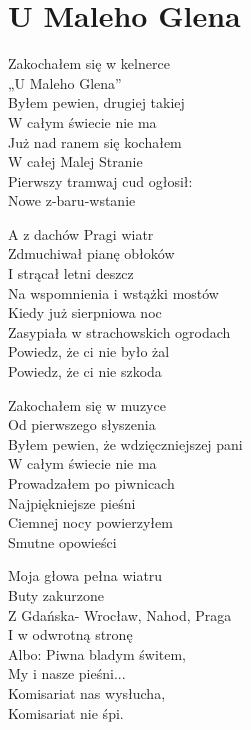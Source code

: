 \section{U Maleho Glena}
\begin{text}
Zakochałem się w kelnerce\\
„U Maleho Glena”\\
Byłem pewien, drugiej takiej\\
W całym świecie nie ma\\
Już nad ranem się kochałem\\
W całej Malej Stranie\\
Pierwszy tramwaj cud ogłosił:\\
Nowe z-baru-wstanie

\vin A z dachów Pragi wiatr\\
\vin Zdmuchiwał pianę obłoków\\
\vin I strącał letni deszcz\\
\vin Na wspomnienia i wstążki mostów\\
\vin Kiedy już sierpniowa noc\\
\vin Zasypiała w strachowskich ogrodach\\
\vin Powiedz, że ci nie było żal\\
\vin Powiedz, że ci nie szkoda

Zakochałem się w muzyce\\
Od pierwszego słyszenia\\
Byłem pewien, że wdzięczniejszej pani\\
W całym świecie nie ma\\
Prowadzałem po piwnicach\\
Najpiękniejsze pieśni\\
Ciemnej nocy powierzyłem\\
Smutne opowieści

Moja głowa pełna wiatru\\
Buty zakurzone\\
Z Gdańska- Wrocław, Nahod, Praga\\
I w odwrotną stronę\\
Albo: Piwna bladym świtem,\\
My i nasze pieśni...\\
Komisariat nas wysłucha,\\
Komisariat nie śpi.
\end{text}